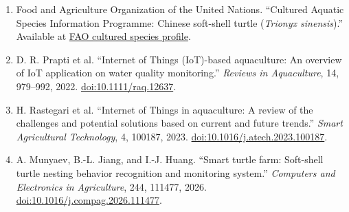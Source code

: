 \documentclass[lang=en,11pt,a4paper]{elegantpaper}
\begin{document}
\renewcommand{\labelenumi}{[\arabic{enumi}]}
\begin{enumerate}
  \item Food and Agriculture Organization of the United Nations. ``Cultured Aquatic Species Information Programme: Chinese soft-shell turtle (\textit{Trionyx sinensis}).'' Available at \href{https://www.fao.org/fishery/culturedspecies/trionyx_sinensis__en/en}{FAO cultured species profile}.

  \item D. R. Prapti et al. ``Internet of Things (IoT)-based aquaculture: An overview of IoT application on water quality monitoring.'' \textit{Reviews in Aquaculture}, 14, 979--992, 2022. \href{https://doi.org/10.1111/raq.12637}{doi:10.1111/raq.12637}.

  \item H. Rastegari et al. ``Internet of Things in aquaculture: A review of the challenges and potential solutions based on current and future trends.'' \textit{Smart Agricultural Technology}, 4, 100187, 2023. \href{https://doi.org/10.1016/j.atech.2023.100187}{doi:10.1016/j.atech.2023.100187}.

  \item A. Munyaev, B.-L. Jiang, and I.-J. Huang. ``Smart turtle farm: Soft-shell turtle nesting behavior recognition and monitoring system.'' \textit{Computers and Electronics in Agriculture}, 244, 111477, 2026. \href{https://doi.org/10.1016/j.compag.2026.111477}{doi:10.1016/j.compag.2026.111477}.
\end{enumerate}
\end{document}
